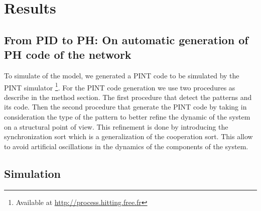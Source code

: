 
\section{Results}

\subsection{From PID to PH: On automatic generation of PH code of the network}

To simulate of the model, we generated a PINT code to be simulated by the PINT simulator \footnote{Available at \url{http://process.hitting.free.fr}}. 
For the PINT code generation we use two procedures as describe in the method section. The first procedure that detect the patterns and its code. Then the second 
procedure that generate the PINT code by taking in consideration the type of the pattern to better refine the dynamic of the system on a structural point of view.
This refinement is done by introducing the synchronization sort  which is a generalization of the cooperation sort. This allow  to avoid artificial oscillations
in the dynamics of the components of the system.




\subsection{Simulation}

